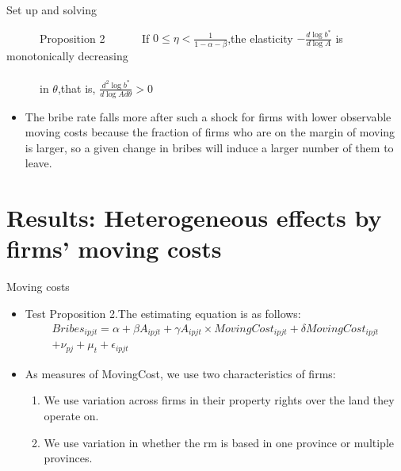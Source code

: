 \documentclass{beamer}
\begin{document}
\begin{frame}{Set up and solving}

\begin{block}{\ \ \ \ \ \ Proposition 2}
\ \ \ \ \ \ If $0\le \eta <\frac{1}{1-\alpha -\beta}$,the elasticity $-\frac{d\log b^*}{d\log A}$ is monotonically decreasing \\~\\
\medskip
\ \ \ \ \ \ in $\theta$,that is, $\frac{d^2\log b^*}{d\log Ad\theta}>0$
\end{block}

\begin{itemize}
\item The bribe rate falls more after such a shock for firms with lower observable moving costs because the fraction of firms who are on the margin of moving is larger, so a given change in bribes will induce a larger number of them to leave.
\end{itemize}

\end{frame}

\section{Results: Heterogeneous effects by firms' moving costs}

\begin{frame}{Moving costs}
\begin{itemize}
\item Test Proposition 2.The estimating equation is as follows:
\begin{equation}
\begin{split}
Bribes_{ipjt}=\alpha +\beta A_{ipjt}+\gamma A_{ipjt}\times MovingCost_{ipjt}+\delta MovingCost_{ipjt} \\
+\nu _{pj}+\mu _t+\epsilon _{ipjt}
\end{split}
\end{equation}

\item As measures of MovingCost, we use two characteristics of firms:
\begin{enumerate}
\item We use variation across firms in their property rights over the land they operate on.
\item We use variation in whether the rm is based in one province or multiple provinces.
\end{enumerate}

\end{itemize}

\end{frame}
\end{document}
